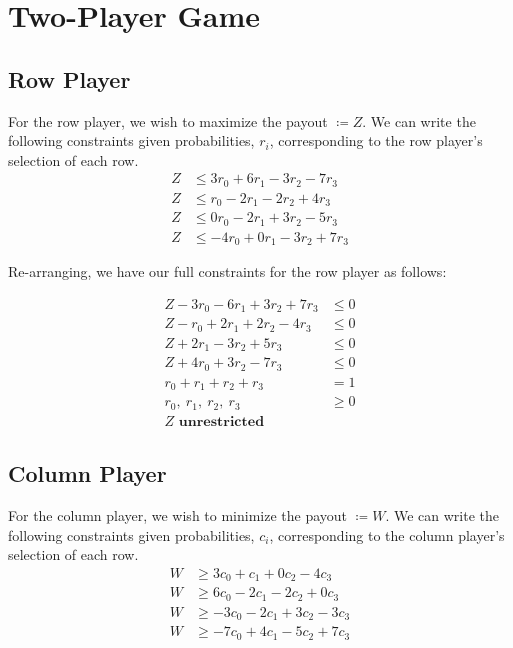 \documentclass[conference]{styles/acmsiggraph}
\newcommand{\?}{\stackrel{?}{=}}
\DeclareRobustCommand{\myalignbox}[2][gray!20]{%
\begin{tcolorbox}[   %
        breakable,
        left=0pt,
        right=0pt,
        top=0pt,
        bottom=12pt,
        colback=#1,
        colframe=#1,
        width=\dimexpr\textwidth\relax, 
        enlarge left by=0mm,
        boxsep=5pt,
        arc=0pt,outer arc=0pt,
        ]
        #2
\end{tcolorbox}
}
\begin{document}
\newpage



\section{Two-Player Game}
\subsection{Row Player}
For the row player, we wish to maximize the payout $\coloneq Z$.  We can write the following constraints given probabilities, $r_i$, corresponding to the row player's selection of each row.
\begin{align*}
    Z & \leq 3r_0 + 6r_1 - 3r_2 - 7r_3\\
    Z & \leq r_0 - 2r_1 - 2r_2 + 4r_3\\
    Z & \leq 0r_0 - 2r_1 + 3r_2 - 5r_3\\
    Z & \leq -4r_0 + 0r_1 - 3r_2 + 7r_3
\end{align*}

Re-arranging, we have our full constraints for the row player as follows:
\myalignbox{
\begin{align}
    Z - 3r_0 - 6r_1 + 3r_2 + 7r_3 & \leq 0\\
    Z - r_0 + 2r_1 + 2r_2 - 4r_3 & \leq 0\\
    Z + 2r_1 - 3r_2 + 5r_3& \leq 0\\
    Z + 4r_0 + 3r_2 - 7r_3 & \leq 0 \\
    r_0 + r_1 + r_2 + r_3 &= 1\\
    r_0,\ r_1,\ r_2,\ r_3 & \geq 0 \\
    Z \textbf{ unrestricted}
\end{align}
}

\subsection{Column Player}
For the column player, we wish to minimize the payout $\coloneq W$.  We can write the following constraints given probabilities, $c_i$, corresponding to the column player's selection of each row.
\begin{align*}
    W & \geq 3c_0 + c_1 + 0c_2 - 4c_3\\
    W & \geq 6c_0 - 2c_1 - 2c_2 + 0c_3\\
    W & \geq -3c_0 - 2c_1 + 3c_2 - 3c_3\\
    W & \geq -7c_0 + 4c_1 - 5c_2 + 7c_3
\end{align*}
\end{document}
